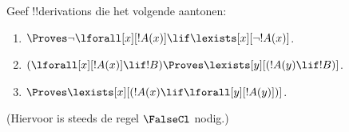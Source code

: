 \documentclass[../../../include/open-logic-section]{subfiles}
\begin{document}
\begin{prob}
Geef !!{derivation}s die het volgende aantonen:
\begin{enumerate}
\item $\Proves \lnot\lforall[x][!A(x)] \lif \lexists[x][\lnot!A(x)]$.
\item $(\lforall[x][!A(x)] \lif !B) \Proves \lexists[y][(!A(y) \lif !B)]$.
\item $\Proves \lexists[x][(!A(x) \lif \lforall[y][!A(y)])]$.
\end{enumerate}
(Hiervoor is steeds de regel $\FalseCl$ nodig.)
\end{prob}
\end{document}
